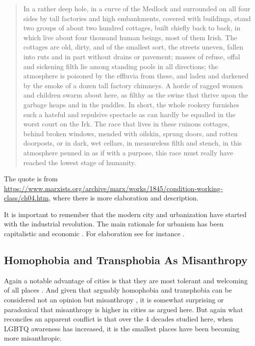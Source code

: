 \documentclass[11pt, letterpaper]{article}
\begin{document}
\begin{spacing}{1.4}
\begin{quote}
  In a rather deep hole, in a curve of the Medlock and surrounded on all four
  sides by tall factories and high embankments, covered with buildings, stand
  two groups of about two hundred cottages, built chiefly back to back, in which
  live about four thousand human beings, most of them Irish. The cottages are
  old, dirty, and of the smallest sort, the streets uneven, fallen into ruts and
  in part without drains or pavement; masses of refuse, offal and sickening
  filth lie among standing pools in all directions; the atmosphere is poisoned
  by the effluvia from these, and laden and darkened by the smoke of a dozen
  tall factory chimneys. A horde of ragged women and children swarm about here,
  as filthy as the swine that thrive upon the garbage heaps and in the
  puddles. In short, the whole rookery furnishes such a hateful and repulsive
  spectacle as can hardly be equalled in the worst court on the Irk. The race
  that lives in these ruinous cottages, behind broken windows, mended with
  oilskin, sprung doors, and rotten doorposts, or in dark, wet cellars, in
  measureless filth and stench, in this atmosphere penned in as if with a
  purpose, this race must really have reached the lowest stage of humanity.
\end{quote}


 The quote is from
 \url{https://www.marxists.org/archive/marx/works/1845/condition-working-class/ch04.htm},
 where there is more elaboration and description. 

It is important to remember that the modern city and urbanization have started with the industrial revolution. The main rationale for
urbanism has been capitalistic and economic \citep{osullivan09,glaeser11}.
 For elaboration see for instance \citet{harvey12,aokCityBook15,molotch76}.

\subsection{Homophobia and Transphobia As Misanthropy}

Again a notable advantage of cities is that they are most tolerant and welcoming of all places \citep{park84,tuch87,wirth38,stephan82,aok20}. And given that arguably homophobia and transphobia can be considered not an opinion but misanthropy \citep{lehmannMISC22jun6}, 
it is somewhat surprising or paradoxical that misanthropy is higher in cities as
argued here. But again what reconciles an apparent conflict is that over the 4
decades studied here,  when LGBTQ awareness has increased, it is the smallest places have been becoming more misanthropic. 


\end{spacing}
\end{document}
